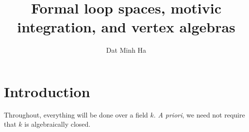 

\setcounter{section}{-1}





    \title{Formal loop spaces, motivic integration, and vertex algebras}
    
    \author{Dat Minh Ha}
    \maketitle
    
    \begin{abstract}
        
    \end{abstract}
    
    {
      \hypersetup{} 
      \tableofcontents %
    }

    \section{Introduction}
        \begin{convention}
            Throughout, everything will be done over a field $k$. \textit{A priori}, we need not require that $k$ is algebraically closed.
        \end{convention}

    

    

    
	
    \printbibliography

